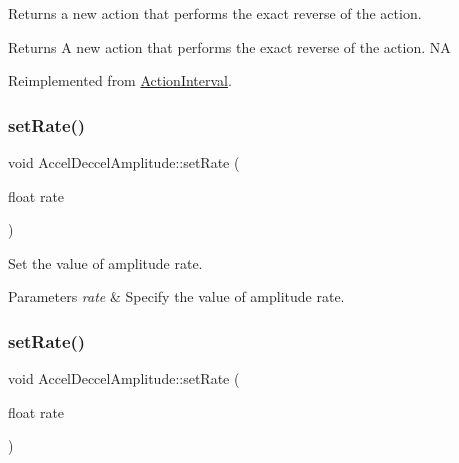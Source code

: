 Returns a new action that performs the exact reverse of the action.

\begin{DoxyReturn}{Returns}
A new action that performs the exact reverse of the action.  NA 
\end{DoxyReturn}


Reimplemented from \hyperlink{classActionInterval_a9f9ac7164036a0bc261a72f62a2b2da7}{Action\+Interval}.

\mbox{\label{classAccelDeccelAmplitude_a296256081f994850630d8ea889edba4a}} 
\subsubsection{\texorpdfstring{set\+Rate()}{setRate()}\hspace{0.1cm}{\footnotesize\ttfamily [1/2]}}
{\footnotesize\ttfamily void Accel\+Deccel\+Amplitude\+::set\+Rate (\begin{DoxyParamCaption}\item[{float}]{rate }\end{DoxyParamCaption})\hspace{0.3cm}{\ttfamily [inline]}}



Set the value of amplitude rate. 


\begin{DoxyParams}{Parameters}
{\em rate} & Specify the value of amplitude rate. \\
\hline
\end{DoxyParams}
\mbox{\label{classAccelDeccelAmplitude_a296256081f994850630d8ea889edba4a}} 
\subsubsection{\texorpdfstring{set\+Rate()}{setRate()}\hspace{0.1cm}{\footnotesize\ttfamily [2/2]}}
{\footnotesize\ttfamily void Accel\+Deccel\+Amplitude\+::set\+Rate (\begin{DoxyParamCaption}\item[{float}]{rate }\end{DoxyParamCaption})\hspace{0.3cm}{\ttfamily [inline]}}



